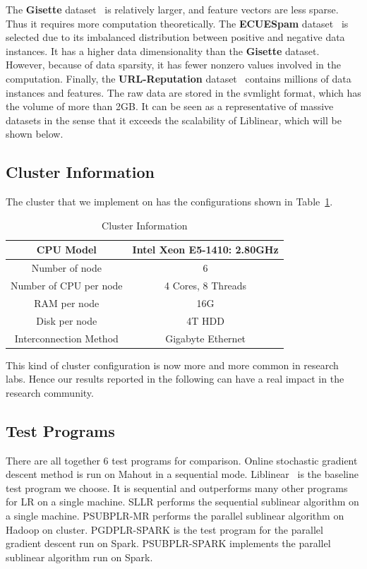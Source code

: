 \documentclass[10pt, conference, compsocconf]{IEEEtran}
\begin{document}
The \textbf{Gisette} dataset~\cite{guyon2004result} is relatively larger, and feature vectors are less sparse. Thus it requires more computation theoretically.
The \textbf{ECUESpam} dataset~\cite{DelanyKBS05} is selected due to its imbalanced distribution between positive and negative data instances. It has a higher data dimensionality than the \textbf{Gisette} dataset. However, because of data sparsity, it has fewer nonzero values involved in the computation.
Finally, the \textbf{URL-Reputation} dataset~\cite{ma2009identifying} contains millions of data instances and features. The raw data are stored in the svmlight format, which has the volume of more than 2GB. It can be seen as a representative of massive datasets in the sense that it exceeds the scalability of Liblinear, which will be shown below.

\subsection{Cluster Information}
The cluster that we implement on has the configurations shown in Table~\ref{tab:table2}.
\begin{table}[h]
\centering
\caption{Cluster Information}\label{tab:table2}\vspace{-0.3cm}
\begin{tabular}{|c|c|}
\hline
    CPU Model & Intel Xeon E5-1410: 2.80GHz \\
\hline
    Number of node & 6 \\
\hline
    Number of CPU per node & 4 Cores, 8 Threads \\
\hline
    RAM per node & 16G \\
\hline
    Disk per node & 4T HDD\\
\hline
    Interconnection Method & Gigabyte Ethernet  \\
\hline
\end{tabular}
\end{table}
This kind of cluster configuration is now more and more common in research labs. Hence our results reported in the following can have a real impact in the research community.

\subsection{Test Programs}
There are all together 6 test programs for comparison.
Online stochastic gradient descent method is run on Mahout in a sequential mode.
Liblinear~\cite{fan2008liblinear} is the baseline test program we choose. It is sequential and outperforms many other programs for LR on a single machine.
SLLR performs the sequential sublinear algorithm on a single machine.
PSUBPLR-MR performs the parallel sublinear algorithm on Hadoop on cluster.
PGDPLR-SPARK is the test program for the parallel gradient descent run on Spark.
PSUBPLR-SPARK implements the parallel sublinear algorithm run on Spark.
\end{document}

